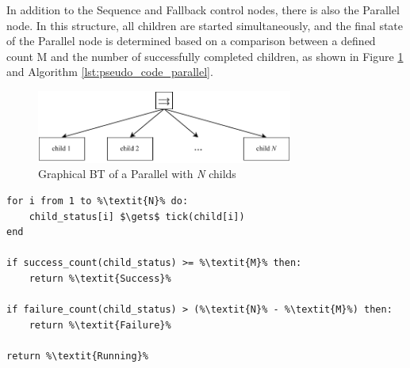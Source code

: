 In addition to the Sequence and Fallback control nodes, there is also the Parallel node. In this structure, all children are started simultaneously, and the final state of the Parallel node is determined based on a comparison between a defined count M and the number of successfully completed children, as shown in Figure \ref{fig:parallel} and Algorithm \ref{lst:pseudo_code_parallel}.

\begin{figure}[h]
    \centering \captionsetup{justification=centering}
    \includegraphics[width=0.75\textwidth]{figures/20_state_of_the_art/parallel.pdf}
    \caption{Graphical BT of a Parallel with \textit{N} childs}
    \label{fig:parallel}
\end{figure}
  
\begin{lstlisting}[float=!h]
for i from 1 to %\textit{N}% do:
    child_status[i] $\gets$ tick(child[i])
end
    
if success_count(child_status) >= %\textit{M}% then:
    return %\textit{Success}%
        
if failure_count(child_status) > (%\textit{N}% - %\textit{M}%) then:
    return %\textit{Failure}%

return %\textit{Running}%
\end{lstlisting}


